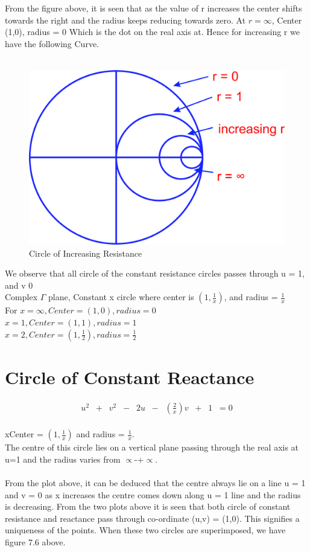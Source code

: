 From the figure above, it is seen that as the value of r increases the center shifts towards the right and the radius keeps reducing towards zero. At $r = \infty$, Center (1,0), radius = 0 Which is the dot on the real axis at. Hence for increasing r we have the following Curve.\\\\
\begin{figure}[h]
\centering
\includegraphics[width=0.5\linewidth]{./graphics/rghmgfcx}
\caption{Circle of Increasing Resistance}
\label{fig:rghmgfcx}
\end{figure}
We observe that all circle of the constant resistance circles passes through u = 1, and v  0\\
Complex $\Gamma$ plane, Constant x circle where center is $(1,\frac{1}{x})$, and radius = $\frac{1}{x}$\\
For $x = \infty,Center = (1,0), radius = 0$\\
 $x = 1,Center = (1,1), radius = 1$\\
  $x = 2,Center = (1,\frac{1}{2}), radius = \frac{1}{2}$\\
\section{Circle of Constant Reactance}
\begin{align*}
u^2\;\;+\;\;v^2\;\;-\;\;2u\;\;-\;\;(\frac{2}{x})v\;\;+\;\;1\;\;=0
\end{align*}\\
xCenter = $(1,\frac{1}{x})$ and radius = $\frac{1}{x}$. \\
The centre of this circle lies on a vertical plane passing through the real axis at u=1 and the radius varies from $ \propto $-+$ \propto $.\\\\
From the plot above, it can be deduced that the centre always lie on a line u = 1 and v = 0 as x increases the centre comes down along u = 1 line and the radius is decreasing.  
From the two plots above it is seen that both circle of constant resistance and reactance pass through co-ordinate (u,v) = (1,0). This signifies a uniqueness of the points.  When these two circles are superimposed, we have figure 7.6 above.

